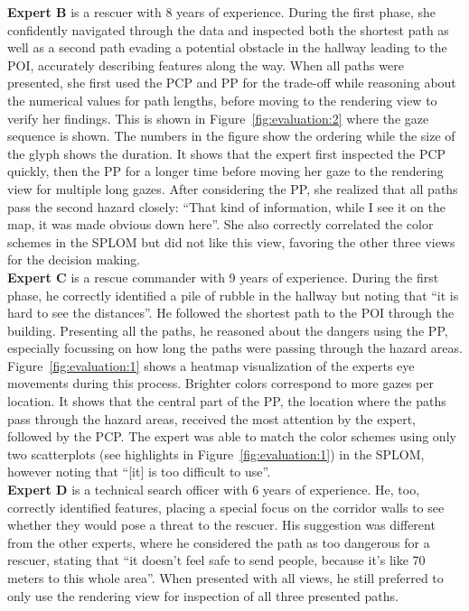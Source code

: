 \documentclass{egpubl}
\begin{document}
%
\textbf{Expert B} is a rescuer with 8 years of experience. During the first phase, she confidently navigated through the data and inspected both the shortest path as well as a second path evading a potential obstacle in the hallway leading to the POI, accurately describing features along the way. When all paths were presented, she first used the PCP and PP for the trade-off while reasoning about the numerical values for path lengths, before moving to the rendering view to verify her findings. This is shown in Figure~\ref{fig:evaluation:2} where the gaze sequence is shown. The numbers in the figure show the ordering while the size of the glyph shows the duration. It shows that the expert first inspected the PCP quickly, then the PP for a longer time before moving her gaze to the rendering view for multiple long gazes. After considering the PP, she realized that all paths pass the second hazard closely: ``That kind of information, while I see it on the map, it was made obvious down here''. She also correctly correlated the color schemes in the SPLOM but did not like this view, favoring the other three views for the decision making.\\
%
\textbf{Expert C} is a rescue commander with 9 years of experience. During the first phase, he correctly identified a pile of rubble in the hallway but noting that ``it is hard to see the distances''. He followed the shortest path to the POI through the building. Presenting all the paths, he reasoned about the dangers using the PP, especially focussing on how long the paths were passing through the hazard areas. Figure~\ref{fig:evaluation:1} shows a heatmap visualization of the experts eye movements during this process. Brighter colors correspond to more gazes per location. It shows that the central part of the PP, the location where the paths pass through the hazard areas, received the most attention by the expert, followed by the PCP. The expert was able to match the color schemes using only two scatterplots (see highlights in Figure~\ref{fig:evaluation:1}) in the SPLOM, however noting that ``[it] is too difficult to use''.\\
%
\textbf{Expert D} is a technical search officer with 6 years of experience. He, too, correctly identified features, placing a special focus on the corridor walls to see whether they would pose a threat to the rescuer. His suggestion was different from the other experts, where he considered the path as too dangerous for a rescuer, stating that ``it doesn't feel safe to send people, because it's like 70 meters to this whole area''. When presented with all views, he still preferred to only use the rendering view for inspection of all three presented paths.\\
\end{document}
